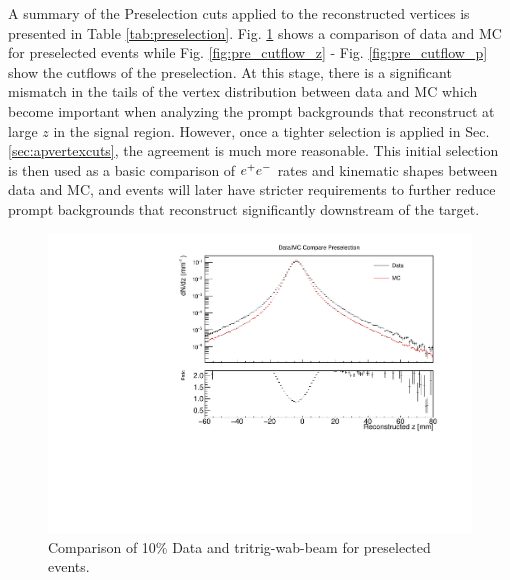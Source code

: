 \clearpage

A summary of the Preselection cuts applied to the reconstructed vertices is presented in Table \ref{tab:preselection}. %
Fig. \ref{fig:preselection} shows a comparison of data and MC for preselected events while Fig. \ref{fig:pre_cutflow_z} - Fig. \ref{fig:pre_cutflow_p} show the cutflows of the preselection. At this stage, there is a significant mismatch in the tails of the vertex distribution between data and MC which become important when analyzing the prompt backgrounds that reconstruct at large $z$ in the signal region. However, once a tighter selection is applied in Sec. \ref{sec:apvertexcuts}, the agreement is much more reasonable. This initial selection is then used as a basic comparison of $e^{+}e^{-}$ rates and kinematic shapes between data and MC, and events will later have stricter requirements to further reduce prompt backgrounds that reconstruct significantly downstream of the target.

\begin{figure}[!ht] 
    \centering
    \includegraphics[width=.85\textwidth]{figs/recon/preselection_compare.pdf}
    \caption{
     Comparison of 10\% Data and tritrig-wab-beam for preselected events.
    }
    \label{fig:preselection}
\end{figure} 

